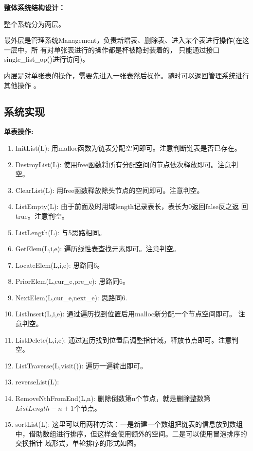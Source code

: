 \documentclass[supercite]{Experimental_Report}
\theoremstyle{definition}
\begin{document}
	\textbf{整体系统结构设计：}\par
	整个系统分为两层。\par
	最外层是管理系统Management，负责新增表、删除表、进入某个表进行操作(在这一层中，所
	有对单张表进行的操作都是杯被隐封装着的，
	只能通过接口single\_list\_op()进行访问)。\par
	内层是对单张表的操作，需要先进入一张表然后操作。随时可以返回管理系统进行其他操作
	。

\subsection{系统实现}
	\noindent \textbf{单表操作:}\par
	\begin{enumerate}
		\item InitList(L): 用malloc函数为链表分配空间即可。注意判断链表是否已存在。
		\item DestroyList(L): 使用free函数将所有分配空间的节点依次释放即可。注意判
		空。
		\item ClearList(L): 用free函数释放除头节点的空间即可。注意判空。
		\item ListEmpty(L): 由于前面及时用域length记录表长，表长为0返回false反之返
		回true。注意判空。
		\item ListLength(L): 与5思路相同。
		\item GetElem(L,i,e): 遍历线性表查找元素即可。注意判空。
		\item LocateElem(L,i,e): 思路同6。
		\item PriorElem(L,cur\_e,pre\_e): 思路同6。
		\item NextElem(L,cur\_e,next\_e): 思路同6.
		\item ListInsert(L,i,e): 通过遍历找到位置后用malloc新分配一个节点空间即可。
		注意判空。
		\item ListDelete(L,i,e): 通过遍历找到位置后调整指针域，释放节点即可。注意判
		空。
		\item ListTraverse(L,visit()): 遍历一遍输出即可。
		\item reverseList(L): 
		\item RemoveNthFromEnd(L,n): 
		删除倒数第n个节点，就是删除整数第$ListLength-n+1$个节点。
		\item sortList(L): 这里可以用两种方法：一是新建一个数组把链表的信息放到数组
		中，借助数组进行排序，但这样会使用额外的空间。二是可以使用冒泡排序的交换指针
		域形式，单轮排序的形式如图。
		\begin{figure}[H]
			\centering

\end{figure}
\end{enumerate}
\end{document}
